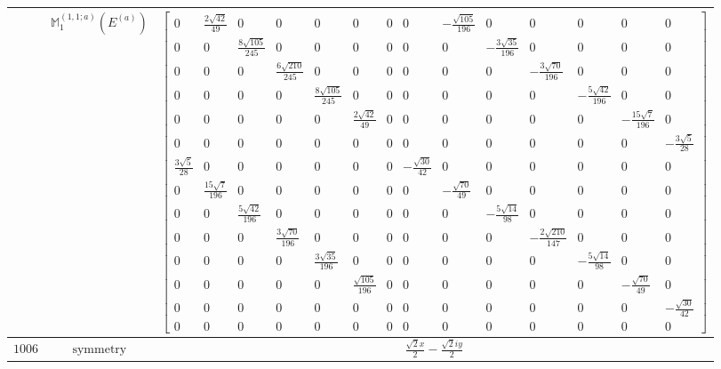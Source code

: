 \documentclass[fleqn,8pt,landscape]{jsarticle}
\begin{document}
\begin{longtable}{ccc}
$  $ & $ \mathbb{M}_{1}^{(1,1;a)}(E^{(a)}) $ & $ \begin{bmatrix} 0 & \frac{2 \sqrt{42}}{49} & 0 & 0 & 0 & 0 & 0 & 0 & - \frac{\sqrt{105}}{196} & 0 & 0 & 0 & 0 & 0 \\ 0 & 0 & \frac{8 \sqrt{105}}{245} & 0 & 0 & 0 & 0 & 0 & 0 & - \frac{3 \sqrt{35}}{196} & 0 & 0 & 0 & 0 \\ 0 & 0 & 0 & \frac{6 \sqrt{210}}{245} & 0 & 0 & 0 & 0 & 0 & 0 & - \frac{3 \sqrt{70}}{196} & 0 & 0 & 0 \\ 0 & 0 & 0 & 0 & \frac{8 \sqrt{105}}{245} & 0 & 0 & 0 & 0 & 0 & 0 & - \frac{5 \sqrt{42}}{196} & 0 & 0 \\ 0 & 0 & 0 & 0 & 0 & \frac{2 \sqrt{42}}{49} & 0 & 0 & 0 & 0 & 0 & 0 & - \frac{15 \sqrt{7}}{196} & 0 \\ 0 & 0 & 0 & 0 & 0 & 0 & 0 & 0 & 0 & 0 & 0 & 0 & 0 & - \frac{3 \sqrt{5}}{28} \\ \frac{3 \sqrt{5}}{28} & 0 & 0 & 0 & 0 & 0 & 0 & - \frac{\sqrt{30}}{42} & 0 & 0 & 0 & 0 & 0 & 0 \\ 0 & \frac{15 \sqrt{7}}{196} & 0 & 0 & 0 & 0 & 0 & 0 & - \frac{\sqrt{70}}{49} & 0 & 0 & 0 & 0 & 0 \\ 0 & 0 & \frac{5 \sqrt{42}}{196} & 0 & 0 & 0 & 0 & 0 & 0 & - \frac{5 \sqrt{14}}{98} & 0 & 0 & 0 & 0 \\ 0 & 0 & 0 & \frac{3 \sqrt{70}}{196} & 0 & 0 & 0 & 0 & 0 & 0 & - \frac{2 \sqrt{210}}{147} & 0 & 0 & 0 \\ 0 & 0 & 0 & 0 & \frac{3 \sqrt{35}}{196} & 0 & 0 & 0 & 0 & 0 & 0 & - \frac{5 \sqrt{14}}{98} & 0 & 0 \\ 0 & 0 & 0 & 0 & 0 & \frac{\sqrt{105}}{196} & 0 & 0 & 0 & 0 & 0 & 0 & - \frac{\sqrt{70}}{49} & 0 \\ 0 & 0 & 0 & 0 & 0 & 0 & 0 & 0 & 0 & 0 & 0 & 0 & 0 & - \frac{\sqrt{30}}{42} \\ 0 & 0 & 0 & 0 & 0 & 0 & 0 & 0 & 0 & 0 & 0 & 0 & 0 & 0 \end{bmatrix} $ \\ \hline
$ 1006 $ & $ \text{symmetry} $ & $ \frac{\sqrt{2} x}{2} - \frac{\sqrt{2} i y}{2} $ \\

\end{longtable}
\end{document}
